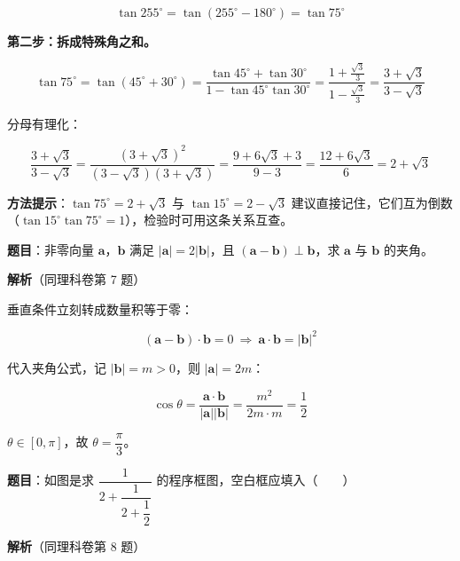 \[\tan255^\circ=\tan(255^\circ-180^\circ)=\tan75^\circ\]

\textbf{第二步：拆成特殊角之和。}

\[\tan75^\circ=\tan(45^\circ+30^\circ)=\frac{\tan45^\circ+\tan30^\circ}{1-\tan45^\circ\tan30^\circ}=\frac{1+\frac{\sqrt3}3}{1-\frac{\sqrt3}3}=\frac{3+\sqrt3}{3-\sqrt3}\]

分母有理化：

\[\frac{3+\sqrt3}{3-\sqrt3}=\frac{(3+\sqrt3)^{2}}{(3-\sqrt3)(3+\sqrt3)}=\frac{9+6\sqrt3+3}{9-3}=\frac{12+6\sqrt3}6=2+\sqrt3\]


\begin{gktip}
\textbf{方法提示}：$\tan75^\circ=2+\sqrt3$ 与 $\tan15^\circ=2-\sqrt3$ 建议直接记住，它们互为倒数（$\tan15^\circ\tan75^\circ=1$），检验时可用这条关系互查。
\end{gktip}

\par\medskip


\textbf{题目}：非零向量 $\boldsymbol a$，$\boldsymbol b$ 满足 $|\boldsymbol a|=2|\boldsymbol b|$，且 $(\boldsymbol a-\boldsymbol b)\perp\boldsymbol b$，求 $\boldsymbol a$ 与 $\boldsymbol b$ 的夹角。

\textbf{解析}（同理科卷第 7 题）

垂直条件立刻转成数量积等于零：

\[(\boldsymbol a-\boldsymbol b)\cdot\boldsymbol b=0\ \Longrightarrow\ \boldsymbol a\cdot\boldsymbol b=|\boldsymbol b|^{2}\]

代入夹角公式，记 $|\boldsymbol b|=m>0$，则 $|\boldsymbol a|=2m$：

\[\cos\theta=\frac{\boldsymbol a\cdot\boldsymbol b}{|\boldsymbol a||\boldsymbol b|}=\frac{m^{2}}{2m\cdot m}=\frac12\]

$\theta\in[0,\pi]$，故 $\theta=\dfrac\pi3$。


\par\medskip


\textbf{题目}：如图是求 $\dfrac1{2+\dfrac1{2+\dfrac12}}$ 的程序框图，空白框应填入（　　）

\begin{center}\end{center}

\textbf{解析}（同理科卷第 8 题）


